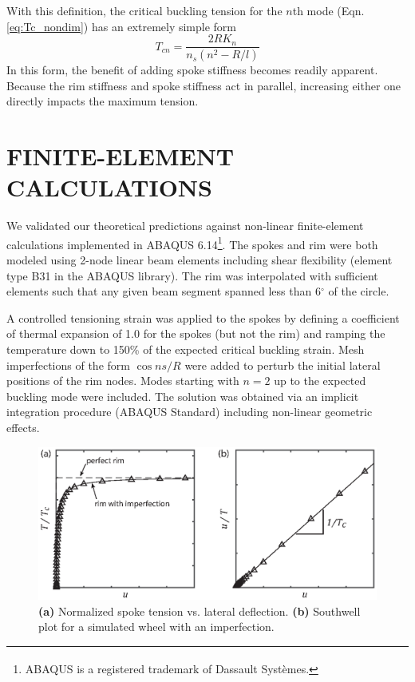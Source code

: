\documentclass{bmd2016p}
\begin{document}
With this definition, the critical buckling tension for the $n$th mode (Eqn. \ref{eq:Tc_nondim}) has an extremely simple form
	\begin{equation}\label{eq:Tc_Kn}
	T_{cn} = \frac{2RK_n}{n_s(n^2 - R/l)}
	\end{equation}
In this form, the benefit of adding spoke stiffness becomes readily apparent. Because the rim stiffness and spoke stiffness act in parallel, increasing either one directly impacts the maximum tension.




\section{FINITE-ELEMENT CALCULATIONS}
We validated our theoretical predictions against non-linear finite-element calculations implemented in ABAQUS\textsuperscript{\textregistered} 6.14\footnote{ABAQUS\textsuperscript{\textregistered} is a registered trademark of Dassault Syst\`emes.}. The spokes and rim were both modeled using 2-node linear beam elements including shear flexibility (element type B31 in the ABAQUS library). The rim was interpolated with sufficient elements such that any given beam segment spanned less than 6$^{\circ}$ of the circle.

A controlled tensioning strain was applied to the spokes by defining a coefficient of thermal expansion of 1.0 for the spokes (but not the rim) and ramping the temperature down to 150\% of the expected critical buckling strain. Mesh imperfections of the form $\cos{ns/R}$ were added to perturb the initial lateral positions of the rim nodes. Modes starting with $n=2$ up to the expected buckling mode were included. The solution was obtained via an implicit integration procedure (ABAQUS Standard) including non-linear geometric effects.

\begin{figure}[!ht]
\centering
\includegraphics[scale=1.0]{figures/bmd_figures-07.eps}
\caption{\textbf{(a)} Normalized spoke tension vs. lateral deflection. \textbf{(b)} Southwell plot for a simulated wheel with an imperfection.}
\label{fig:Southwell}
\end{figure}
\end{document}
